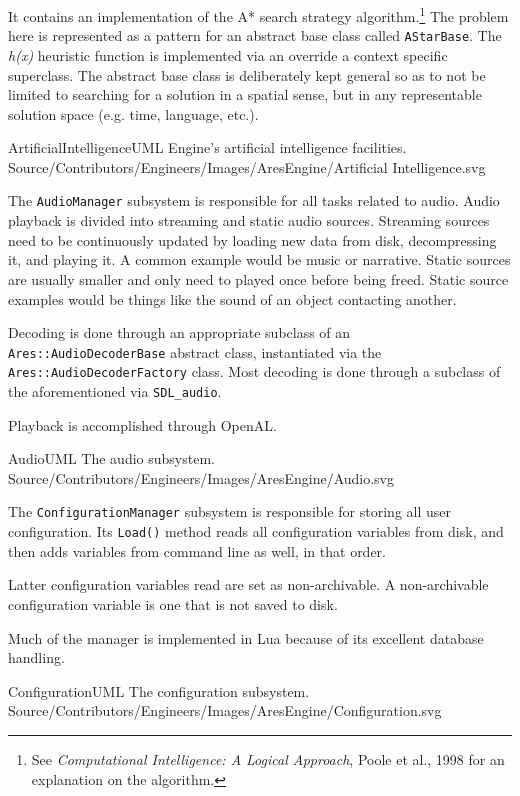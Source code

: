 It contains an implementation of the A* search strategy algorithm.\footnote{See {\it Computational Intelligence: A Logical Approach}, Poole et al., 1998 for an explanation on the algorithm.} The problem here is represented as a pattern for an abstract base class called {\tt AStarBase}. The {\it h(x)} heuristic function is implemented via an override a context specific superclass. The abstract base class is deliberately kept general so as to not be limited to searching for a solution in a spatial sense, but in any representable solution space (e.g. time, language, etc.).

\FullPageDiagram
    {ArtificialIntelligenceUML}
    {Engine's artificial intelligence facilities.}
    {Source/Contributors/Engineers/Images/AresEngine/Artificial Intelligence.svg}

\page
{}
The {\tt AudioManager} subsystem is responsible for all tasks related to audio. Audio playback is divided into streaming and static audio sources. Streaming sources need to be continuously updated by loading new data from disk, decompressing it, and playing it. A common example would be music or narrative. Static sources are usually smaller and only need to played once before being freed. Static source examples would be things like the sound of an object contacting another.

Decoding is done through an appropriate subclass of an {\tt Ares::AudioDecoderBase} abstract class, instantiated via the {\tt Ares::AudioDecoderFactory} class. Most decoding is done through a subclass of the aforementioned via {\tt SDL_audio}.

Playback is accomplished through OpenAL.

\FullPageDiagram
    {AudioUML}
    {The audio subsystem.}
    {Source/Contributors/Engineers/Images/AresEngine/Audio.svg}

\page
{}
The {\tt ConfigurationManager} subsystem is responsible for storing all user configuration. Its {\tt Load()} method reads all configuration variables from disk, and then adds variables from command line as well, in that order. 

Latter configuration variables read are set as non-archivable. A non-archivable configuration variable is one that is not saved to disk.

Much of the manager is implemented in Lua because of its excellent database handling.

\FullPageDiagram
    {ConfigurationUML}
    {The configuration subsystem.}
    {Source/Contributors/Engineers/Images/AresEngine/Configuration.svg}

